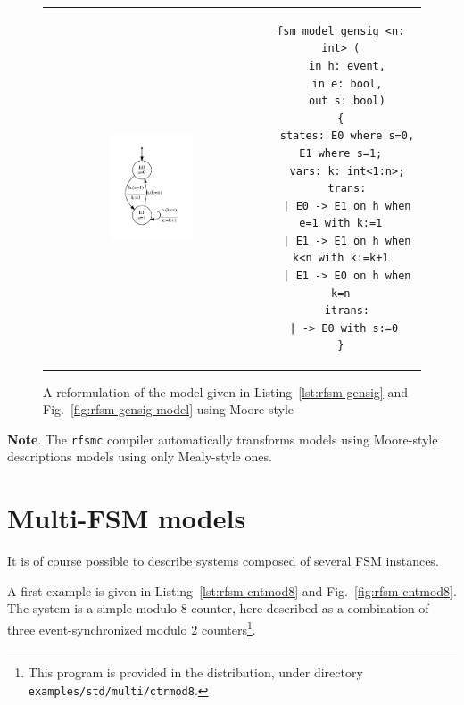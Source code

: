 \begin{figure}[htbp]
  \centering
  \begin{tabular}[c]{cc}
\includegraphics[width=0.4\textwidth]{figs/gensig-model-moore} &
\begin{minipage}[b]{0.6\textwidth}
\begin{lstlisting}[language=Rfsm]
fsm model gensig <n: int> (
  in h: event,
  in e: bool,
  out s: bool)
{
  states: E0 where s=0, E1 where s=1;
  vars: k: int<1:n>;
  trans:
  | E0 -> E1 on h when e=1 with k:=1
  | E1 -> E1 on h when k<n with k:=k+1
  | E1 -> E0 on h when k=n
  itrans:
 | -> E0 with s:=0
}
\end{lstlisting}
\end{minipage}
  \end{tabular}
  \caption{A reformulation of the model given in Listing~\ref{lst:rfsm-gensig} and
    Fig.~\ref{fig:rfsm-gensig-model} using Moore-style}
  \label{fig:rfsm-gensig-moore}
\end{figure}

\medskip \textbf{Note}. The \texttt{rfsmc} compiler automatically transforms models using
Moore-style descriptions models using only Mealy-style ones.


\section*{Multi-FSM models}
\label{sec:multi-fsm-models}

It is of course possible to describe systems composed of several FSM instances.

\medskip
A first example is given in Listing~\ref{lst:rfsm-cntmod8} and Fig.~\ref{fig:rfsm-cntmod8}. The system is a simple modulo 8 counter, here
described as a combination of three event-synchronized modulo 2 counters\footnote{This program is
  provided in the distribution, under directory \texttt{examples/std/multi/ctrmod8}.}.

